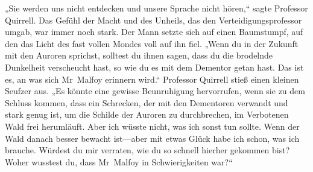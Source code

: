 „Sie werden uns nicht entdecken und unsere Sprache nicht hören,“ sagte Professor Quirrell. Das Gefühl der Macht und des Unheils, das den Verteidigungsprofessor umgab, war immer noch stark. Der Mann setzte sich auf einen Baumstumpf, auf den das Licht des fast vollen Mondes voll auf ihn fiel. „Wenn du in der Zukunft mit den Auroren sprichst, solltest du ihnen sagen, dass du die brodelnde Dunkelheit verscheucht hast, so wie du es mit dem Dementor getan hast. Das ist es, an was sich Mr~Malfoy erinnern wird.“ Professor Quirrell stieß einen kleinen Seufzer aus. „Es könnte eine gewisse Beunruhigung hervorrufen, wenn sie zu dem Schluss kommen, dass ein Schrecken, der mit den Dementoren verwandt und stark genug ist, um die Schilde der Auroren zu durchbrechen, im Verbotenen Wald frei herumläuft. Aber ich wüsste nicht, was ich sonst tun sollte. Wenn der Wald danach besser bewacht ist—aber mit etwas Glück habe ich schon, was ich brauche. Würdest du mir verraten, wie du so schnell hierher gekommen bist? Woher wusstest du, dass Mr~Malfoy in Schwierigkeiten war?“

